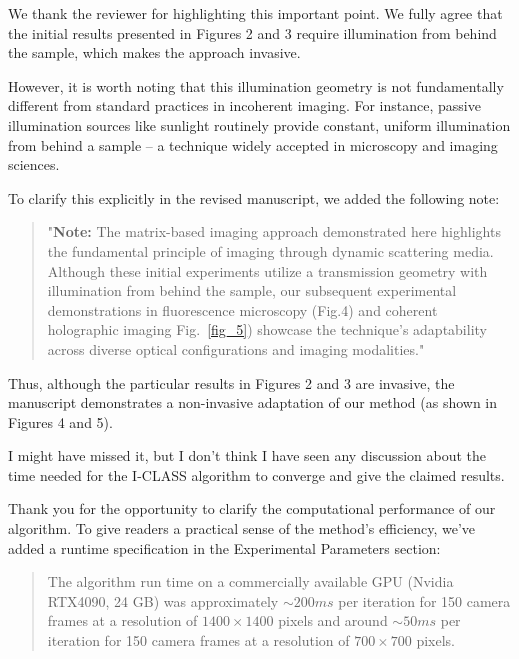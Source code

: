 \documentclass[12pt]{article}
\newenvironment{solved_reviewercomment}
    {\begin{tcolorbox}[width=\linewidth,colback=gray!5,colframe=solved_commentcolor!50,title=Reviewer Comment,left=5pt,right=5pt]}
    {\end{tcolorbox}}
\newenvironment{ourresponse}
    {\begin{tcolorbox}[width=\linewidth,breakable,enhanced,colback=gray!5,colframe=responsecolor!50,title=Response,left=5pt,right=5pt]}
    {\end{tcolorbox}}
\begin{document}
        \begin{ourresponse}
            We thank the reviewer for highlighting this important point.
            We fully agree that the initial results presented in Figures 2 and 3 require illumination from behind the sample, which makes the approach invasive. 
            
            However, it is worth noting that this illumination geometry is not fundamentally different from standard practices in incoherent imaging. For instance, passive illumination sources like sunlight routinely provide constant, uniform illumination from behind a sample – a technique widely accepted in microscopy and imaging sciences.
            
            To clarify this explicitly in the revised manuscript, we added the following note:
            \begin{quote}
                "\textbf{Note:} The matrix-based imaging approach demonstrated here highlights the fundamental principle of imaging through dynamic scattering media. Although these initial experiments utilize a transmission geometry with illumination from behind the sample, our subsequent experimental demonstrations in fluorescence microscopy (Fig.4) and coherent holographic imaging Fig.~\ref{fig_5}) showcase the technique's adaptability across diverse optical configurations and imaging modalities."
            \end{quote}
            
            Thus, although the particular results in Figures 2 and 3 are invasive, the manuscript demonstrates a non-invasive adaptation of our method (as shown in Figures 4 and 5).
        \end{ourresponse}
       
    \leavevmode\vspace{-\baselineskip}
        \begin{solved_reviewercomment}
            I might have missed it, but I don't think I have seen any discussion about the time needed for the I-CLASS algorithm to converge and give the claimed results.
        \end{solved_reviewercomment}
        \begin{ourresponse}
            Thank you for the opportunity to clarify the computational performance of our algorithm. To give readers a practical sense of the method's efficiency, we've added a runtime specification in the Experimental Parameters section:
            
            \begin{quote}
                The algorithm run time on a commercially available GPU (Nvidia RTX4090, 24 GB) was approximately $\sim 200ms$ per iteration for 150 camera frames at a resolution of $1400 \times 1400$ pixels and around $\sim 50ms$ per iteration for 150 camera frames at a resolution of $700 \times 700$ pixels.
            \end{quote}
        \end{ourresponse}
            
\end{document}
